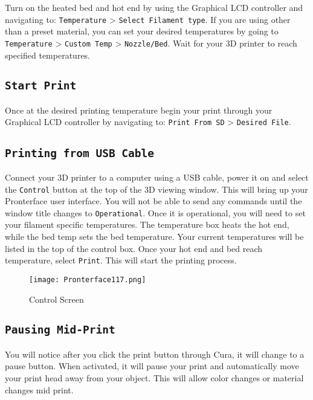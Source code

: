 Turn on the heated bed and hot end by using the Graphical LCD controller and navigating to: \texttt{Temperature} > \texttt{Select Filament type}. If you are using other than a preset material, you can set your desired temperatures by going to \texttt{Temperature} > \texttt{Custom Temp} > \texttt{Nozzle/Bed}. Wait for your 3D printer to reach specified temperatures.

\subsection{\texttt{Start Print}}
Once at the desired printing temperature begin your print through your Graphical LCD controller by navigating to: \texttt{Print From SD} > \texttt{Desired File}.


\subsection{\texttt{Printing from USB Cable}}

Connect your 3D printer to a computer using a USB cable, power it on and select the \texttt{Control} button at the top of the 3D viewing window. This will bring up your Pronterface user interface. You will not be able to send any commands until the window title changes to \texttt{Operational}. Once it is operational, you will need to set your filament specific temperatures. The temperature box heats the hot end, while the bed temp sets the bed temperature. Your current temperatures will be listed in the top of the control box. Once your hot end and bed reach temperature, select \texttt{Print}. This will start the printing process. 



\begin{figure}[H]
\centering
\texttt{[image: Pronterface117.png]}
\caption{Control Screen}
\label{fig:Control}
\end{figure}

\subsection{\texttt{Pausing Mid-Print}}
You will notice after you click the print button through Cura, it will change to a pause button. When activated, it will pause your print and automatically move your print head away from your object. This will allow color changes or material changes mid print.


